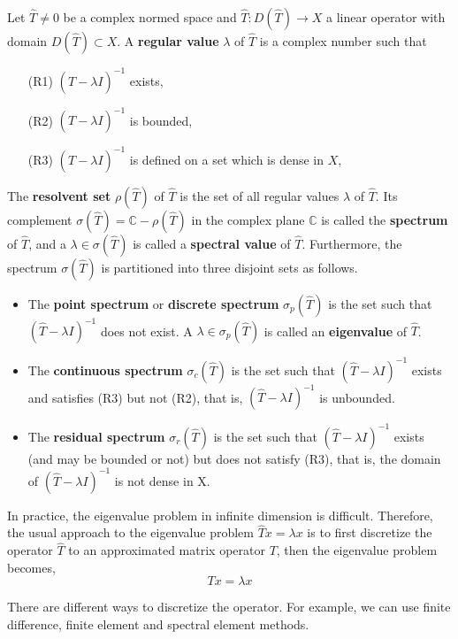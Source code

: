 \begin{definition}
	Let $\hat{T}\neq{0}$ be a complex normed space and $\hat{T}: D(\hat{T}) \to X$ a linear operator with domain $D(\hat{T})\subset X$. A \textbf{regular value} $\lambda$ of $\hat{T}$ is a complex number such that
	\begin{itemize}
		\item [(R1)] $(\hat{T}-\lambda I)^{-1}$ exists,
		\item [(R2)] $(\hat{T}-\lambda I)^{-1}$ is bounded,
		\item [(R3)] $(\hat{T}-\lambda I)^{-1}$ is defined on a set which is dense in $X$,
	\end{itemize}
	
	The \textbf{resolvent set} $\rho(\hat{T})$ of $\hat{T}$ is the set of all regular values $\lambda$ of $\hat{T}$. Its complement $\sigma(\hat{T}) = \mathbb{C} - \rho(\hat{T})$ in the complex plane $\mathbb{C}$ is called the \textbf{spectrum} of $\hat{T}$, and a $\lambda\in \sigma(\hat{T})$ is called a \textbf{spectral value} of $\hat{T}$. Furthermore, the spectrum $\sigma(\hat{T})$ is partitioned into three disjoint sets as follows.
	\begin{itemize}
		\item The \textbf{point spectrum} or \textbf{discrete spectrum} $\sigma_p(\hat{T})$ is the set such that $(\hat{T}-\lambda I)^{-1}$ does not exist. A $\lambda\in\sigma_p(\hat{T})$ is called an \textbf{eigenvalue} of $\hat{T}$.
		\item The \textbf{continuous spectrum} $\sigma_c(\hat{T})$ is the set such that $(\hat{T}-\lambda I)^{-1}$ exists and satisfies (R3) but not (R2), that is, $(\hat{T}-\lambda I)^{-1}$ is unbounded.
		\item The \textbf{residual spectrum} $\sigma_r(\hat{T})$ is the set such that $(\hat{T}-\lambda I)^{-1}$ exists (and may be bounded or not) but does not satisfy (R3), that is, the domain of $(\hat{T}-\lambda I)^{-1}$ is not dense in X.
	\end{itemize}
\end{definition}

In practice, the eigenvalue problem in infinite dimension is difficult. 
Therefore, the usual approach to the eigenvalue problem $\hat{T}x=\lambda x$ is to first discretize the operator $\hat{T}$ to an approximated matrix operator $T$, then the eigenvalue problem becomes,
\[ Tx = \lambda x \]

There are different ways to discretize the operator. For example, we can use finite difference, finite element and spectral element methods. 

